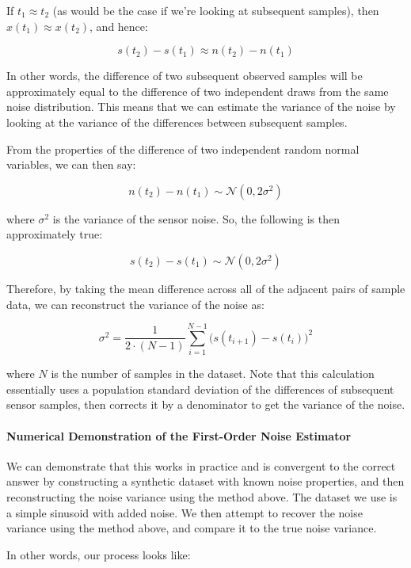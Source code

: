 \documentclass[11pt]{article}
\begin{document}
If \(t_1 \approx t_2\) (as would be the case if we're looking at
subsequent samples), then \(x(t_1) \approx x(t_2)\), and hence:

\[s(t_2) - s(t_1) \approx n(t_2) - n(t_1)\]

    In other words, the difference of two subsequent observed samples will
be approximately equal to the difference of two independent draws from
the same noise distribution. This means that we can estimate the
variance of the noise by looking at the variance of the differences
between subsequent samples.

From the properties of the difference of two independent random normal
variables, we can then say:

\[n(t_2) - n(t_1) \sim \mathcal{N}(0, 2\sigma^2)\]

where \(\sigma^2\) is the variance of the sensor noise. So, the
following is then approximately true:

\[s(t_2) - s(t_1) \sim \mathcal{N}(0, 2\sigma^2)\]

    Therefore, by taking the mean difference across all of the adjacent
pairs of sample data, we can reconstruct the variance of the noise as:

\[\sigma^2 = \frac{1}{2 \cdot (N-1)} \sum_{i=1}^{N-1} \Big( s(t_{i+1}) - s(t_i) \Big)^2\]

where \(N\) is the number of samples in the dataset. Note that this
calculation essentially uses a population standard deviation of the
differences of subsequent sensor samples, then corrects it by a
denominator to get the variance of the noise.

    \hypertarget{numerical-demonstration-of-the-first-order-noise-estimator}{%
\paragraph{Numerical Demonstration of the First-Order Noise
Estimator}\label{numerical-demonstration-of-the-first-order-noise-estimator}}

We can demonstrate that this works in practice and is convergent to the
correct answer by constructing a synthetic dataset with known noise
properties, and then reconstructing the noise variance using the method
above. The dataset we use is a simple sinusoid with added noise. We then
attempt to recover the noise variance using the method above, and
compare it to the true noise variance.

    In other words, our process looks like:
\end{document}

